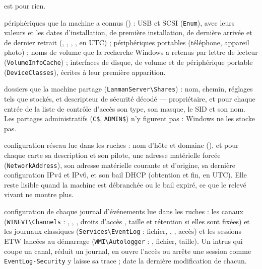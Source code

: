 \documentclass[11pt,a4paper,oneside]{report}
\begin{document}
\begin{description}[style=nextline,leftmargin=1.2em]
        est pour rien.
  \item[\fichier{devices.json}] périphériques que la machine a connus
        () : USB et SCSI (\texttt{Enum}), avec leurs valeurs et les
        dates d'installation, de première installation, de dernière arrivée et
        de dernier retrait (, ,
        , , en UTC) ; périphériques
        portables (téléphone, appareil photo) ; noms de volume que la recherche
        Windows a retenus par lettre de lecteur (\texttt{VolumeInfoCache}) ;
        interfaces de disque, de volume et de périphérique portable
        (\texttt{DeviceClasses}), écrites à leur première apparition.
  \item[\fichier{network\_shares.json}] dossiers que la machine partage
        (\texttt{LanmanServer\textbackslash Shares}) : nom, chemin, réglages tels
        que stockés, et descripteur de sécurité décodé --- propriétaire, et pour
        chaque entrée de la liste de contrôle d'accès son type, son masque, le
        SID et son nom. Les partages administratifs (\texttt{C\$},
        \texttt{ADMIN\$}) n'y figurent pas : Windows ne les stocke pas.
  \item[\fichier{network\_configuration.json}] configuration réseau lue dans
        les ruches : nom d'hôte et domaine (), et pour chaque carte
        sa description et son pilote, une adresse matérielle forcée
        (\texttt{NetworkAddress}), son adresse matérielle courante et
        d'origine, sa dernière configuration IPv4 et IPv6, et son bail DHCP
        (obtention et fin, en UTC). Elle reste lisible quand la machine est
        débranchée ou le bail expiré, ce que le relevé vivant ne montre plus.
  \item[\fichier{event\_log\_configuration.json}] configuration de chaque
        journal d'événements lue dans les ruches : les canaux
        (\texttt{WINEVT\textbackslash Channels} : ,
        , , droits d'accès
        , taille et rétention si elles sont fixées) et les
        journaux classiques (\texttt{Services\textbackslash EventLog} :
        fichier, , , accès) et les sessions
        ETW lancées au démarrage (\texttt{WMI\textbackslash Autologger} :
        , fichier, taille). Un intrus qui coupe un canal, réduit
        un journal, en ouvre l'accès ou arrête une session comme
        \texttt{EventLog-Security} y laisse sa trace ;  date la dernière modification de chacun.

\end{description}
\end{document}
